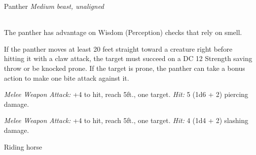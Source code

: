\documentclass[10pt,twoside,twocolumn,openany]{book}
\begin{document}
\begin{monsterboxnobg}{Panther}
	\textit{Medium beast, unaligned}\\
	\hline
	\basics[
		armorclass	= 12,
		hitpoints		= 13 (3d8),
		speed		= {50 ft., climb 40 ft.}
	]
	\hline
	\stats[
		STR	= \stat{14},
		DEX	= \stat{15},
		CON	= \stat{10},
		INT	= \stat{3},
		WIS	= \stat{14},
		CHA	= \stat{7}
	]
	\hline
	\details[
		skills			= {Perception +4, Stealth +6},
		senses		= {passive Perception 14},
		languages		= {-},
		challenge		= 1/4
	]
	\hline \\[1mm]
	\begin{monsteraction}
		The panther has advantage on Wisdom (Perception) checks that rely on smell.
	\end{monsteraction}
	
	\begin{monsteraction}[Pounce]
		If the panther moves at least 20 feet straight toward a creature right before hitting it with a claw attack, the target must succeed on a DC 12 Strength saving throw or be knocked prone. If the target is prone, the panther can take a bonus action to make one bite attack against it.
	\end{monsteraction}
	\begin{monsteraction}[Bite]
		\textit{Melee Weapon Attack:} +4 to hit, reach 5ft., one target. \textit{Hit:} 5 (1d6 + 2) piercing damage.
	\end{monsteraction}
	
	\begin{monsteraction}[Claw]
		\textit{Melee Weapon Attack:} +4 to hit, reach 5ft., one target. \textit{Hit:} 4 (1d4 + 2) slashing damage.
	\end{monsteraction}
\end{monsterboxnobg}

Riding horse
\end{document}
